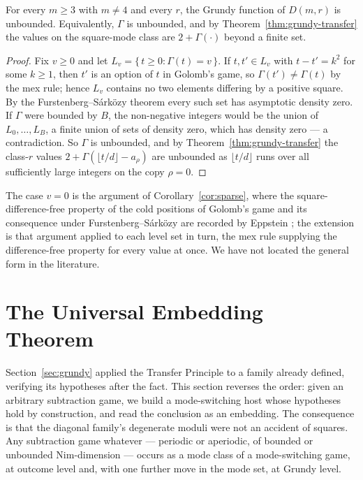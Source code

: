 \begin{corollary}\label{cor:unbounded}
For every $m \ge 3$ with $m \ne 4$ and every $r$, the Grundy function of
$D(m,r)$ is unbounded. Equivalently, $\Gamma$ is unbounded, and by
Theorem~\ref{thm:grundy-transfer} the values on the square-mode class are
$2 + \Gamma(\cdot)$ beyond a finite set.
\end{corollary}
\begin{proof}
Fix $v \ge 0$ and let $L_v = \{\, t \ge 0 : \Gamma(t) = v \,\}$. If
$t, t' \in L_v$ with $t - t' = k^2$ for some $k \ge 1$, then $t'$ is an
option of $t$ in Golomb's game, so $\Gamma(t') \ne \Gamma(t)$ by the mex
rule; hence $L_v$ contains no two elements differing by a positive square.
By the Furstenberg--S\'ark\"ozy theorem every such set has asymptotic
density zero. If $\Gamma$ were bounded by $B$, the non-negative integers
would be the union of $L_0, \ldots, L_B$, a finite union of sets of
density zero, which has density zero --- a contradiction. So $\Gamma$ is
unbounded, and by Theorem~\ref{thm:grundy-transfer} the class-$r$ values
$2 + \Gamma(\lfloor t/d \rfloor - a_\rho)$ are unbounded as
$\lfloor t/d \rfloor$ runs over all sufficiently large integers on the
copy $\rho = 0$.
\end{proof}

The case $v = 0$ is the argument of Corollary~\ref{cor:sparse}, where the
square-difference-free property of the cold positions of Golomb's game and
its consequence under Furstenberg--S\'ark\"ozy are recorded by Eppstein
\cite{eppstein}; the extension is that argument applied to each level set
in turn, the mex rule supplying the difference-free property for every
value at once. We have not located the general form in the literature.

\section{The Universal Embedding Theorem}\label{sec:embed}

Section~\ref{sec:grundy} applied the Transfer Principle to a family
already defined, verifying its hypotheses after the fact. This section
reverses the order: given an arbitrary subtraction game, we build a
mode-switching host whose hypotheses hold by construction, and read the
conclusion as an embedding. The consequence is that the diagonal family's
degenerate moduli were not an accident of squares. Any subtraction game
whatever --- periodic or aperiodic, of bounded or unbounded
Nim-dimension --- occurs as a mode class of a mode-switching game, at
outcome level and, with one further move in the mode set, at Grundy
level.

